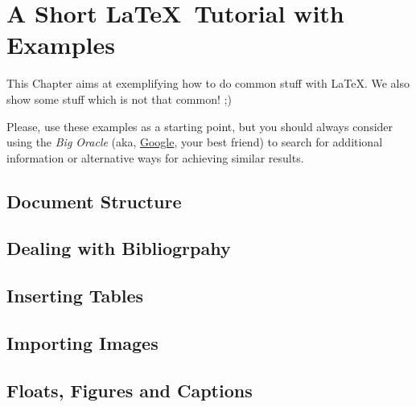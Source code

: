 \chapter{A Short \LaTeX\ Tutorial with Examples}
\label{cha:a_short_latex_tutorial_with_examples}

This Chapter aims at exemplifying how to do common stuff with \LaTeX. We also show some stuff which is not that common! ;)

Please, use these examples as a starting point, but you should always consider using the \emph{Big Oracle} (aka, \href{http://www.google.com}{Google}, your best friend) to search for additional information or alternative ways for achieving similar results.

\section{Document Structure} %
\label{sec:document_structure}



\section{Dealing with Bibliogrpahy} %
\label{sec:dealing_with_bibliogrpahy}



\section{Inserting Tables} %
\label{sec:inserting_tables}



\section{Importing Images} %
\label{sec:importing_images}



\section{Floats, Figures and Captions} %
\label{sec:floats_figures_and_captions}

